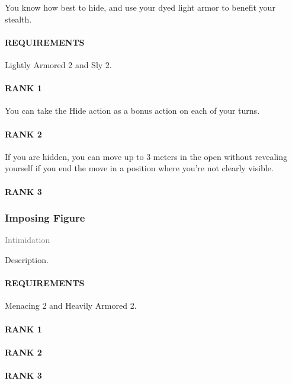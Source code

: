 \normalsize
You know how best to hide, and use your dyed light armor to benefit your stealth.
\paragraph{REQUIREMENTS} Lightly Armored 2 and Sly 2.
\paragraph{RANK 1} You can take the Hide action as a bonus action on each of your turns.
\paragraph{RANK 2} If you are hidden, you can move up to 3 meters in the open without revealing yourself if you end the move in a position where you're not clearly visible.
\paragraph{RANK 3}

\subsubsection{Imposing Figure} \label{tal::imposingfigure}
\small{\textcolor{gray}{Intimidation}}

\normalsize
Description.
\paragraph{REQUIREMENTS} Menacing 2 and Heavily Armored 2.
\paragraph{RANK 1}
\paragraph{RANK 2}
\paragraph{RANK 3}


